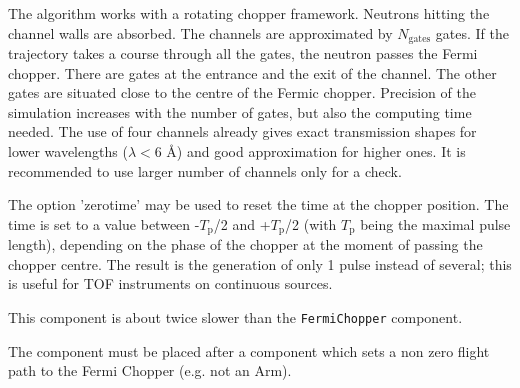 The algorithm works with a rotating chopper framework. Neutrons hitting the channel
walls are absorbed. The channels are approximated by $N_\textrm{gates}$ gates. If the trajectory
takes a course through all the gates, the neutron passes the Fermi chopper. There are gates at
the entrance and the exit of the channel. The other gates are situated close to the centre of
the Fermic chopper.
Precision of the simulation increases with the number of gates, but also the computing time needed.
The use of four channels already gives exact transmission shapes for lower wavelengths
($\lambda < 6$ \AA) and good approximation for higher ones. It is recommended to use larger number of
channels only for a check.

The option 'zerotime' may be used to reset the time at the chopper position. The time is
set to a value between -$T_\textrm{p}$/2 and +$T_\textrm{p}$/2 (with $T_\textrm{p}$ being the maximal pulse length),
depending on the phase of the chopper at the moment of passing the chopper centre. The
result is the generation of only 1 pulse instead of several; this is useful for TOF instruments
on continuous sources.

This component is about twice slower than the \verb+FermiChopper+ component.

The component must be placed after a component which sets a non zero flight path to the Fermi Chopper (e.g. not an Arm).
